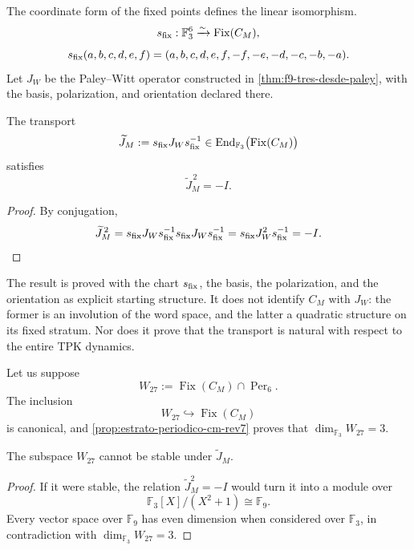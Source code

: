 The coordinate form of the fixed points defines the linear isomorphism.
\[
 s_{\rm fix}:\mathbb F_3^6\xrightarrow{\sim}\operatorname{Fix}(C_M),
\]
\[
 s_{\rm fix}(a,b,c,d,e,f)
 =(a,b,c,d,e,f,-f,-e,-d,-c,-b,-a).
\]
Let \(J_W\) be the Paley--Witt operator constructed in
\cref{thm:f9-tres-desde-paley}, with the basis, polarization, and orientation
declared there.

\begin{proposition}[Complex structure \(\widetilde J_M^{\,2}=-I\) on the fixed stratum]
\label{prop:raiz-menos-uno-estrato-fijo-cm}
The transport
\[
\widetilde J_M:=s_{\rm fix}J_Ws_{\rm fix}^{-1}
\in\operatorname{End}_{\mathbb F_3}
   \bigl(\operatorname{Fix}(C_M)\bigr)
\]
satisfies
\[
 \widetilde J_M^{\,2}=-I.
\]
\end{proposition}

\begin{proof}
By conjugation,
\[
 \widetilde J_M^{\,2}
 =s_{\rm fix}J_Ws_{\rm fix}^{-1}
  s_{\rm fix}J_Ws_{\rm fix}^{-1}
 =s_{\rm fix}J_W^2s_{\rm fix}^{-1}
 =-I.
\]
\end{proof}

The result is proved with the chart \(s_{\rm fix}\), the basis, the polarization, and the orientation as explicit starting structure. It does not identify \(C_M\) with \(J_W\): the former is an involution of the word space, and the latter a quadratic structure on its fixed stratum. Nor does it prove that the transport is natural with respect to the entire TPK dynamics.

Let us suppose
\[
 W_{27}
 :=\operatorname{Fix}(C_M)\cap\operatorname{Per}_6.
\]
The inclusion
\[
 W_{27}\hookrightarrow\operatorname{Fix}(C_M)
\]
is canonical, and \cref{prop:estrato-periodico-cm-rev7} proves that
\(\dim_{\mathbb F_3}W_{27}=3\).

\begin{corollary}
\label{cor:obstruccion-cuadratica-w27}
The subspace \(W_{27}\) cannot be stable under
\(\widetilde J_M\).
\end{corollary}

\begin{proof}
If it were stable, the relation
\(\widetilde J_M^2=-I\) would turn it into a module over
\[
 \mathbb F_3[X]/(X^2+1)\cong\mathbb F_9.
\]
Every vector space over \(\mathbb F_9\) has even dimension when considered
over \(\mathbb F_3\), in contradiction with
\(\dim_{\mathbb F_3}W_{27}=3\).
\end{proof}

